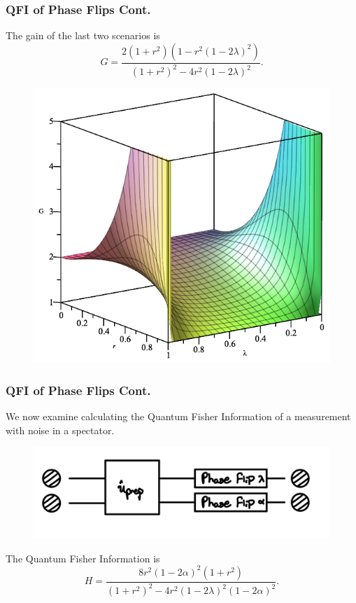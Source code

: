 \documentclass{beamer}
\begin{document}
\begin{frame}
\frametitle{QFI of Phase Flips Cont.}
The gain of the last two scenarios is
\begin{equation}\label{eq:40}
G=\frac{2(1+r^2)(1-r^2(1-2\lambda)^2)}{(1+r^2)^2-4r^2(1-2\lambda)^2}.
\end{equation}
\begin{figure}
\begin{center}
\includegraphics[width=0.50\linewidth]{Phase-Flip-One-Channel-Lambda-and-r-Gain.png}
\end{center}
\end{figure}
\end{frame}
\begin{frame}
\frametitle{QFI of Phase Flips Cont.}
We now examine calculating the Quantum Fisher Information of a measurement with noise in a spectator.
\begin{figure}
\begin{center}
\includegraphics[width=0.75\linewidth]{Two-Particle-Phase-Flip-Dual-Channel-Alpha-Lambda-Schematic.jpg}
\end{center}
\end{figure}
The Quantum Fisher Information is
\begin{equation}\label{eq:41}
H=\frac{8r^2(1-2\alpha)^2(1+r^2)}{(1+r^2)^2-4r^2(1-2\lambda)^2(1-2\alpha)^2}.
\end{equation}
\end{frame}
\end{document}
